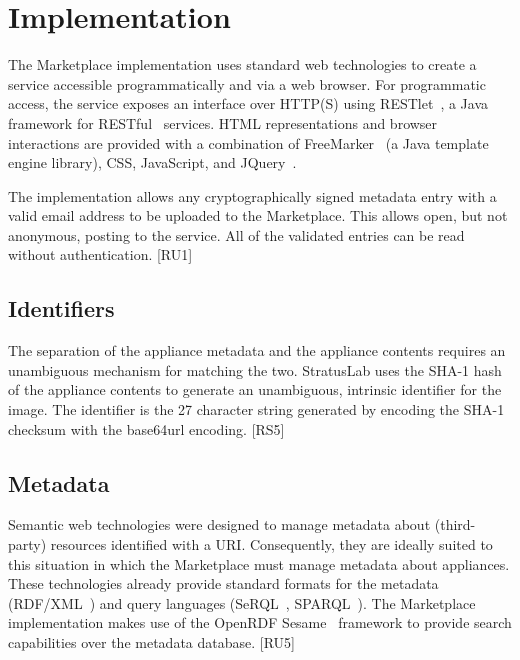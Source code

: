 \section{Implementation}
\label{sec:implementation}

The Marketplace implementation uses standard web technologies to
create a service accessible programmatically and via a web browser.
For programmatic access, the service exposes an interface over HTTP(S)
using RESTlet~\cite{restlet}, a Java framework for RESTful~\cite{rest}
services.  HTML representations and browser interactions are provided
with a combination of FreeMarker~\cite{freemarker} (a Java template
engine library), CSS, JavaScript, and JQuery~\cite{jquery}.

The implementation allows any cryptographically signed metadata entry
with a valid email address to be uploaded to the Marketplace\@.  This
allows open, but not anonymous, posting to the service.  All of the
validated entries can be read without authentication. [RU1]

\subsection{Identifiers}

The separation of the appliance metadata and the appliance contents
requires an unambiguous mechanism for matching the two.  StratusLab
uses the SHA-1 hash of the appliance contents to generate an
unambiguous, intrinsic identifier for the image.  The identifier is
the 27 character string generated by encoding the SHA-1 checksum with
the base64url encoding. [RS5]

\subsection{Metadata}



Semantic web technologies were designed to manage metadata about
(third-party) resources identified with a URI\@.  Consequently, they
are ideally suited to this situation in which the Marketplace must
manage metadata about appliances.  These technologies already provide
standard formats for the metadata (RDF/XML~\cite{rdfxml, rdfprimer,
  rdfschema}) and query languages (SeRQL~\cite{serql},
SPARQL~\cite{sparql}).  The Marketplace implementation makes use of
the OpenRDF Sesame~\cite{sesame} framework to provide search
capabilities over the metadata database. [RU5]

